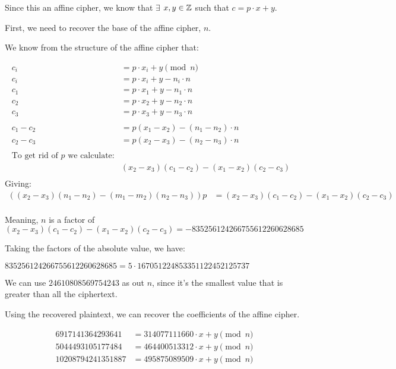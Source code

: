 \begin{Answer}
  Since this an affine cipher, we know that $\exists$ $x, y \in \mathbb{Z}$ such that $c = p \cdot x + y$.

  \noindent
  First, we need to recover the base of the affine cipher, $n$.

  We know from the structure of the affine cipher that:

  \begin{align*}
    c_{i} &= p \cdot x_{i} + y \pmod n\\
    c_{i} &= p \cdot x_{i} + y - n_{i} \cdot n\\
    c_{1} &= p \cdot x_{1} + y - n_{1} \cdot n\\
    c_{2} &= p \cdot x_{2} + y - n_{2} \cdot n\\
    c_{3} &= p \cdot x_{3} + y - n_{3} \cdot n\\
    \\
    c_{1} - c_{2} &= p (x_{1} - x_{2}) - (n_{1} - n_{2}) \cdot n\\
    c_{2} - c_{3} &= p (x_{2} - x_{3}) - (n_{2} - n_{3}) \cdot n\\
    \\
    \text{To get rid of $p$ we calculate:}&&\\
    &(x_{2} - x_{3})(c_{1} - c_{2}) - (x_{1} - x_{2})(c_{2} - c_{3})&\\
  \end{align*}
  Giving:
  \begin{align*}
    ((x_{2} - x_{3})(n_{1}-n_{2}) - (m_{1}-m_{2})(n_{2}-n_{3}))p&= (x_{2} - x_{3})(c_{1} - c_{2}) - (x_{1} - x_{2})(c_{2} - c_{3})\\
  \end{align*}

  \noindent
  Meaning, $n$ is a factor of $(x_{2} - x_{3})(c_{1} - c_{2}) - (x_{1} - x_{2})(c_{2} - c_{3}) = -835256124266755612260628685$

  \noindent
  Taking the factors of the absolute value, we have:

  \noindent
  $835256124266755612260628685 = 5 \cdot 167051224853351122452125737$

  \noindent
  We can use $24610808569754243$ as out $n$, since it's the smallest value
  that is greater than all the ciphertext.

  \noindent
  Using the recovered plaintext, we can recover the coefficients of the affine cipher.

  \begin{align*}
    6917141364293641 &= 314077111660 \cdot x + y \pmod n \\
    5044493105177484 &= 464400513312 \cdot x + y \pmod n \\
    10208794241351887 &= 495875089509 \cdot x + y \pmod n
  \end{align*}


\end{Answer}
